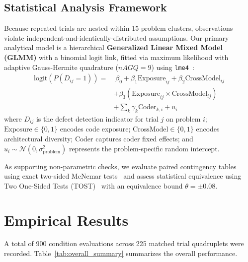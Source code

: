 \documentclass[11pt,a4paper]{article}
\begin{document}
\subsection{Statistical Analysis Framework}
Because repeated trials are nested within 15 problem clusters, observations violate independent-and-identically-distributed assumptions. 
Our primary analytical model is a hierarchical \textbf{Generalized Linear Mixed Model (GLMM)} with a binomial logit link, fitted via maximum likelihood with adaptive Gauss-Hermite quadrature ($nAGQ=9$) using \texttt{lme4}~\cite{bates2015lme4}:
\begin{equation}
\begin{aligned}
\text{logit}\left(P(D_{ij} = 1)\right) = &\; \beta_0 + \beta_1 \text{Exposure}_{ij} + \beta_2 \text{CrossModel}_{ij} \\
&+ \beta_3 (\text{Exposure}_{ij} \times \text{CrossModel}_{ij}) \\
&+ \sum_{k} \gamma_k \text{Coder}_{k, i} + u_i
\end{aligned}
\label{eq:glmm}
\end{equation}
where $D_{ij}$ is the defect detection indicator for trial $j$ on problem $i$; $\text{Exposure} \in \{0, 1\}$ encodes code exposure; $\text{CrossModel} \in \{0, 1\}$ encodes architectural diversity; $\text{Coder}$ captures coder fixed effects; and $u_i \sim \mathcal{N}(0, \sigma_{\text{problem}}^2)$ represents the problem-specific random intercept.

As supporting non-parametric checks, we evaluate paired contingency tables using exact two-sided McNemar tests~\cite{mcnemar1947note} and assess statistical equivalence using Two One-Sided Tests (TOST)~\cite{lakens2017tost} with an equivalence bound $\theta = \pm 0.08$.

\section{Empirical Results}
\label{sec:results}

A total of 900 condition evaluations across 225 matched trial quadruplets were recorded. Table~\ref{tab:overall_summary} summarizes the overall performance.
\end{document}
